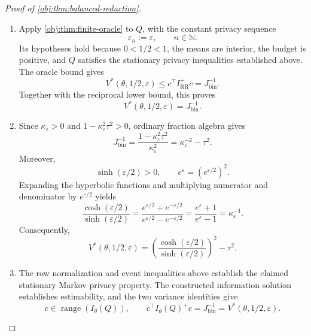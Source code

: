 \begin{proof}[Proof of \cref{obj:thm:balanced-reduction}]
\begin{enumerate}
\item Apply \cref{obj:thm:finite-oracle} to \(Q\), with the constant privacy
sequence
\[
\varepsilon_n:=\varepsilon,
\qquad n\in\mathbb N.
\]
Its hypotheses hold because \(0<1/2<1\), the means are interior, the
budget is positive, and \(Q\) satisfies the stationary privacy
inequalities established above. The oracle bound gives
\[
V^*(\theta,1/2,\varepsilon)
\le c^\top I_{\mathrm{RR}}^+c
=J_{\mathrm{bin}}^{-1}.
\]
Together with the reciprocal lower bound, this proves
\[
V^*(\theta,1/2,\varepsilon)
=J_{\mathrm{bin}}^{-1}.
\]

\item Since \(\kappa_\varepsilon>0\) and
\(1-\kappa_\varepsilon^2\tau^2>0\), ordinary fraction algebra gives
\[
J_{\mathrm{bin}}^{-1}
=
\frac{1-\kappa_\varepsilon^2\tau^2}{\kappa_\varepsilon^2}
=\kappa_\varepsilon^{-2}-\tau^2.
\]
Moreover,
\[
\sinh(\varepsilon/2)>0,
\qquad
e^\varepsilon=(e^{\varepsilon/2})^2.
\]
Expanding the hyperbolic functions and multiplying numerator and
denominator by \(e^{\varepsilon/2}\) yields
\[
\frac{\cosh(\varepsilon/2)}{\sinh(\varepsilon/2)}
=
\frac{e^{\varepsilon/2}+e^{-\varepsilon/2}}
{e^{\varepsilon/2}-e^{-\varepsilon/2}}
=
\frac{e^\varepsilon+1}{e^\varepsilon-1}
=\kappa_\varepsilon^{-1}.
\]
Consequently,
\[
V^*(\theta,1/2,\varepsilon)
=
\left(\frac{\cosh(\varepsilon/2)}{\sinh(\varepsilon/2)}\right)^2
-\tau^2.
\]

\item The row normalization and event inequalities above establish the
claimed stationary Markov privacy property. The constructed information
solution establishes estimability, and the two variance identities give
\[
c\in\operatorname{range}(I_\theta(Q)),
\qquad
c^\top I_\theta(Q)^+c
=J_{\mathrm{bin}}^{-1}
=V^*(\theta,1/2,\varepsilon).
\]
\end{enumerate}
\end{proof}

